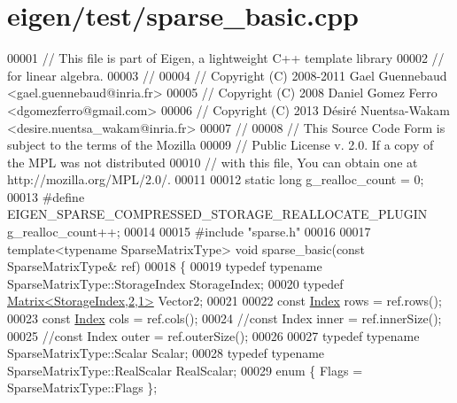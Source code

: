 \hypertarget{eigen_2test_2sparse__basic_8cpp_source}{}\section{eigen/test/sparse\+\_\+basic.cpp}
\label{eigen_2test_2sparse__basic_8cpp_source}

\begin{DoxyCode}
00001 \textcolor{comment}{// This file is part of Eigen, a lightweight C++ template library}
00002 \textcolor{comment}{// for linear algebra.}
00003 \textcolor{comment}{//}
00004 \textcolor{comment}{// Copyright (C) 2008-2011 Gael Guennebaud <gael.guennebaud@inria.fr>}
00005 \textcolor{comment}{// Copyright (C) 2008 Daniel Gomez Ferro <dgomezferro@gmail.com>}
00006 \textcolor{comment}{// Copyright (C) 2013 Désiré Nuentsa-Wakam <desire.nuentsa\_wakam@inria.fr>}
00007 \textcolor{comment}{//}
00008 \textcolor{comment}{// This Source Code Form is subject to the terms of the Mozilla}
00009 \textcolor{comment}{// Public License v. 2.0. If a copy of the MPL was not distributed}
00010 \textcolor{comment}{// with this file, You can obtain one at http://mozilla.org/MPL/2.0/.}
00011 
00012 \textcolor{keyword}{static} \textcolor{keywordtype}{long} g\_realloc\_count = 0;
00013 \textcolor{preprocessor}{#define EIGEN\_SPARSE\_COMPRESSED\_STORAGE\_REALLOCATE\_PLUGIN g\_realloc\_count++;}
00014 
00015 \textcolor{preprocessor}{#include "sparse.h"}
00016 
00017 \textcolor{keyword}{template}<\textcolor{keyword}{typename} SparseMatrixType> \textcolor{keywordtype}{void} sparse\_basic(\textcolor{keyword}{const} SparseMatrixType& ref)
00018 \{
00019   \textcolor{keyword}{typedef} \textcolor{keyword}{typename} SparseMatrixType::StorageIndex StorageIndex;
00020   \textcolor{keyword}{typedef} \hyperlink{group___core___module_class_eigen_1_1_matrix}{Matrix<StorageIndex,2,1>} Vector2;
00021   
00022   \textcolor{keyword}{const} \hyperlink{namespace_eigen_a62e77e0933482dafde8fe197d9a2cfde}{Index} rows = ref.rows();
00023   \textcolor{keyword}{const} \hyperlink{namespace_eigen_a62e77e0933482dafde8fe197d9a2cfde}{Index} cols = ref.cols();
00024   \textcolor{comment}{//const Index inner = ref.innerSize();}
00025   \textcolor{comment}{//const Index outer = ref.outerSize();}
00026 
00027   \textcolor{keyword}{typedef} \textcolor{keyword}{typename} SparseMatrixType::Scalar Scalar;
00028   \textcolor{keyword}{typedef} \textcolor{keyword}{typename} SparseMatrixType::RealScalar RealScalar;
00029   \textcolor{keyword}{enum} \{ Flags = SparseMatrixType::Flags \};

\end{DoxyCode}
